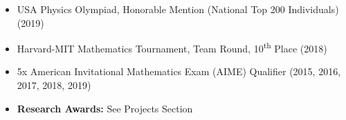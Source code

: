 \documentclass[letterpaper,11pt]{article}
\newcommand{\myitem}[1]{\item #1 \vspace{-9pt}}
\newcommand{\mysubitem}[1]{\item #1 \vspace{-4pt}}
\begin{document}
	\begin{itemize}[leftmargin=*]
		\myitem{USA Physics Olympiad, Honorable Mention (National Top 200 Individuals) (2019)}
		\myitem {Harvard-MIT Mathematics Tournament, Team Round, 10\textsuperscript{th} Place (2018)}
		\myitem {5x American Invitational Mathematics Exam (AIME) Qualifier (2015, 2016, 2017, 2018, 2019)}
			
			

		\myitem {\textbf{Research Awards:} See Projects Section}
	\end{itemize}
\vspace{2pt}
\end{document}
